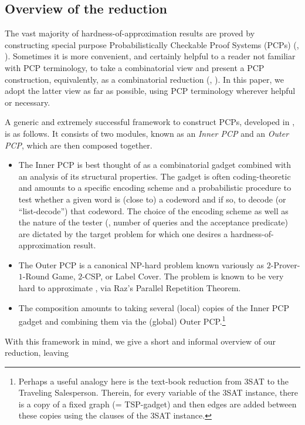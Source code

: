 \documentclass{toc}
\begin{document}
\subsection{Overview of the reduction}

%
The vast majority %
of hardness-of-approximation results are proved by constructing special purpose Probabilistically Checkable Proof Systems (PCPs) (\eg,
\cite{ALMSS98,BGS,Has99,Has01,GHS00,Khot-quasiPCP,Chan13}). Sometimes it is more convenient, and certainly helpful
to a reader not familiar with PCP terminology, to take a combinatorial view and present a PCP construction, equivalently, as a combinatorial reduction (\eg,
\cite{DS05, Dinur07}). In this paper, we adopt the latter view as far as possible, using PCP terminology wherever helpful or necessary.

%
A generic and extremely successful framework to construct PCPs, developed in \cite{ABSS,BGS,Raz98, Has99, Has01}, is as follows.
It consists of two modules, known as an \emph{Inner PCP} and an \emph{Outer PCP}, which are then composed together.  %
%
\begin{itemize}
\item The Inner PCP is best thought of as a combinatorial gadget
combined with an analysis of its structural properties. The gadget is often coding-theoretic and
 amounts to a specific encoding scheme and a probabilistic procedure to test whether a given
word is (close to) a codeword and if so, to decode (or ``list-decode'') that codeword. The choice of the encoding scheme
as well as the nature of the
tester (\eg, number of queries and the acceptance predicate) are dictated by the target problem for which one desires a hardness-of-approximation result.
\item The Outer PCP is a canonical NP-hard problem known variously as $2$-Prover-$1$-Round Game, $2$-CSP, or Label Cover. The problem is known to be
      very hard to approximate \cite{ABSS,Raz98}, via Raz's Parallel Repetition Theorem.
\item The composition amounts to taking several (local) copies of the Inner PCP gadget and
combining %
them via the (global)
      Outer PCP.\footnote{Perhaps a useful analogy here is the text-book reduction from 3SAT to the Traveling Salesperson. Therein, for every variable
      of the 3SAT instance, there is a copy of a fixed graph (= TSP-gadget) and then edges are added between these copies using the clauses of the 3SAT instance.}
\end{itemize}
With this framework in mind, we give a short and informal overview of our reduction, leaving
\end{document}
